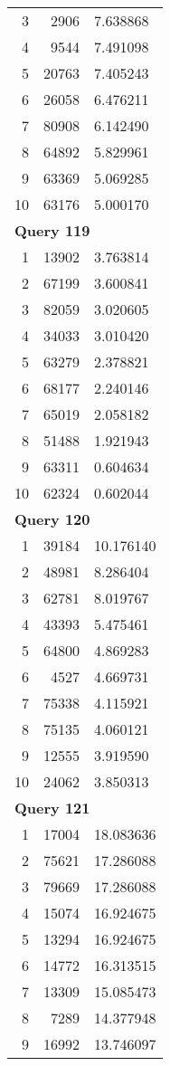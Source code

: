 \begin{longtable}[{p}]{@{}rrp{}@{}}
3 & 2906 & 7.638868 \\
4 & 9544 & 7.491098 \\
5 & 20763 & 7.405243 \\
6 & 26058 & 6.476211 \\
7 & 80908 & 6.142490 \\
8 & 64892 & 5.829961 \\
9 & 63369 & 5.069285 \\
10 & 63176 & 5.000170 \\
\midrule
\multicolumn{3}{l}{\bfseries Query 119} \\
1 & 13902 & 3.763814 \\
2 & 67199 & 3.600841 \\
3 & 82059 & 3.020605 \\
4 & 34033 & 3.010420 \\
5 & 63279 & 2.378821 \\
6 & 68177 & 2.240146 \\
7 & 65019 & 2.058182 \\
8 & 51488 & 1.921943 \\
9 & 63311 & 0.604634 \\
10 & 62324 & 0.602044 \\
\midrule
\multicolumn{3}{l}{\bfseries Query 120} \\
1 & 39184 & 10.176140 \\
2 & 48981 & 8.286404 \\
3 & 62781 & 8.019767 \\
4 & 43393 & 5.475461 \\
5 & 64800 & 4.869283 \\
6 & 4527 & 4.669731 \\
7 & 75338 & 4.115921 \\
8 & 75135 & 4.060121 \\
9 & 12555 & 3.919590 \\
10 & 24062 & 3.850313 \\
\midrule
\multicolumn{3}{l}{\bfseries Query 121} \\
1 & 17004 & 18.083636 \\
2 & 75621 & 17.286088 \\
3 & 79669 & 17.286088 \\
4 & 15074 & 16.924675 \\
5 & 13294 & 16.924675 \\
6 & 14772 & 16.313515 \\
7 & 13309 & 15.085473 \\
8 & 7289 & 14.377948 \\
9 & 16992 & 13.746097 \\

\end{longtable}
